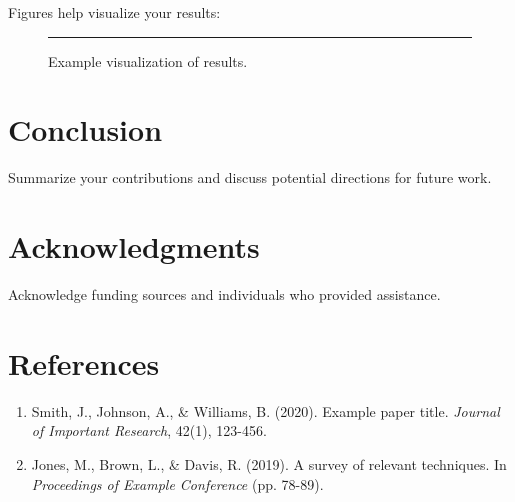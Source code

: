 \documentclass[10pt,a4paper,twocolumn]{article}
\begin{document}
Figures help visualize your results:

\begin{figure}
\centering
\rule{5cm}{4cm} %
\caption{Example visualization of results.}
\label{fig:results}
\end{figure}

\section{Conclusion}
\label{sec:conclusion}

Summarize your contributions and discuss potential directions for future work.

\section*{Acknowledgments}
Acknowledge funding sources and individuals who provided assistance.

\section*{References}
\begin{enumerate}
\item Smith, J., Johnson, A., \& Williams, B. (2020). Example paper title. \textit{Journal of Important Research}, 42(1), 123-456.
\item Jones, M., Brown, L., \& Davis, R. (2019). A survey of relevant techniques. In \textit{Proceedings of Example Conference} (pp. 78-89).
\end{enumerate}
\end{document}
